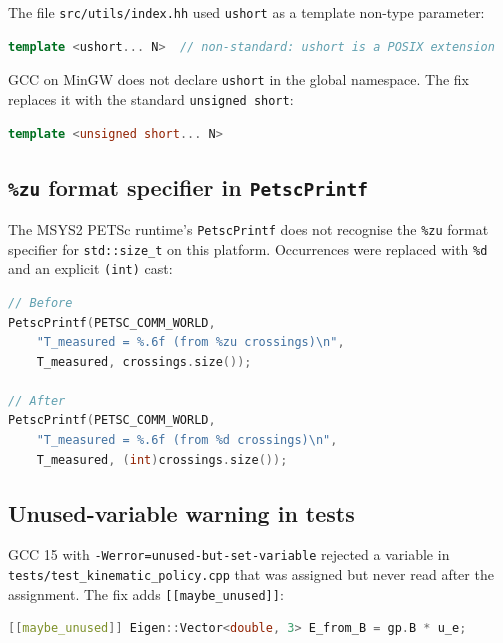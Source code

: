 The file \texttt{src/utils/index.hh} used \texttt{ushort} as a template
non-type parameter:
\begin{lstlisting}[language=C++, basicstyle=\ttfamily\small,
    frame=single, framerule=0.4pt, rulecolor=\color{gray!50},
    breaklines=true, showstringspaces=false]
template <ushort... N>  // non-standard: ushort is a POSIX extension
\end{lstlisting}
GCC on MinGW does not declare \texttt{ushort} in the global namespace.
The fix replaces it with the standard \texttt{unsigned short}:
\begin{lstlisting}[language=C++, basicstyle=\ttfamily\small,
    frame=single, framerule=0.4pt, rulecolor=\color{gray!50},
    breaklines=true, showstringspaces=false]
template <unsigned short... N>
\end{lstlisting}

\subsection{\texttt{\%zu} format specifier in \texttt{PetscPrintf}}

The MSYS2 PETSc runtime's \texttt{PetscPrintf} does not recognise the
\texttt{\%zu} format specifier for \texttt{std::size\_t} on this platform.
Occurrences were replaced with \texttt{\%d} and an explicit \texttt{(int)} cast:
\begin{lstlisting}[language=C++, basicstyle=\ttfamily\small,
    frame=single, framerule=0.4pt, rulecolor=\color{gray!50},
    breaklines=true, showstringspaces=false]
// Before
PetscPrintf(PETSC_COMM_WORLD,
    "T_measured = %.6f (from %zu crossings)\n",
    T_measured, crossings.size());

// After
PetscPrintf(PETSC_COMM_WORLD,
    "T_measured = %.6f (from %d crossings)\n",
    T_measured, (int)crossings.size());
\end{lstlisting}

\subsection{Unused-variable warning in tests}

GCC 15 with \texttt{-Werror=unused-but-set-variable} rejected a variable in
\texttt{tests/test\_kinematic\_policy.cpp} that was assigned but never read
after the assignment.  The fix adds \texttt{[[maybe\_unused]]}:
\begin{lstlisting}[language=C++, basicstyle=\ttfamily\small,
    frame=single, framerule=0.4pt, rulecolor=\color{gray!50},
    breaklines=true, showstringspaces=false]
[[maybe_unused]] Eigen::Vector<double, 3> E_from_B = gp.B * u_e;
\end{lstlisting}

